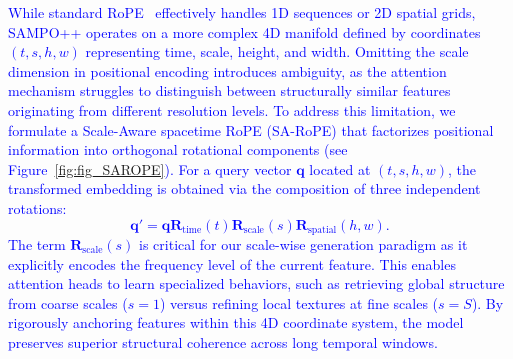 \textcolor{blue}{While standard RoPE~\cite{su2024roformer} effectively handles 1D sequences or 2D spatial grids, SAMPO++ operates on a more complex 4D manifold defined by coordinates $(t, s, h, w)$ representing time, scale, height, and width. Omitting the scale dimension in positional encoding introduces ambiguity, as the attention mechanism struggles to distinguish between structurally similar features originating from different resolution levels. To address this limitation, we formulate a Scale-Aware spacetime RoPE (SA-RoPE) that factorizes positional information into orthogonal rotational components (see Figure~\ref{fig:fig_SAROPE}). For a query vector $\boldsymbol{q}$ located at $(t, s, h, w)$, the transformed embedding is obtained via the composition of three independent rotations:
\begin{equation}
    \boldsymbol{q}' = \boldsymbol{q} \boldsymbol{R}_{\text{time}}(t) \boldsymbol{R}_{\text{scale}}(s) \boldsymbol{R}_{\text{spatial}}(h, w).
\end{equation}
The term $\boldsymbol{R}_{\text{scale}}(s)$ is critical for our scale-wise generation paradigm as it explicitly encodes the frequency level of the current feature. This enables attention heads to learn specialized behaviors, such as retrieving global structure from coarse scales ($s=1$) versus refining local textures at fine scales ($s=S$). By rigorously anchoring features within this 4D coordinate system, the model preserves superior structural coherence across long temporal windows.}




